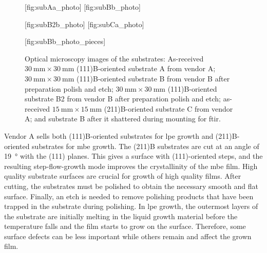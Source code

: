 \begin{figure}[htbp]
    \centering
    [fig:subAa_photo]
    \hfill
    [fig:subBb_photo]
    \par\bigskip
    [fig:subB2b_photo]
    \hfill
    [fig:subCa_photo]
    \par\bigskip
    [fig:subBb_photo_pieces]
    \caption[Optical microscopy images of the substrates.]{Optical microscopy images of the substrates:  As-received $\SI{30}{\milli\metre}\times\SI{30}{\milli\metre}$ (111)B-oriented substrate A from vendor A;  $\SI{30}{\milli\metre}\times\SI{30}{\milli\metre}$ (111)B-oriented substrate B from vendor B after preparation polish and etch;  $\SI{30}{\milli\metre}\times\SI{30}{\milli\metre}$ (111)B-oriented substrate B2 from vendor B after preparation polish and etch;  as-received $\SI{15}{\milli\metre}\times\SI{15}{\milli\metre}$ (211)B-oriented substrate C from vendor A; and  substrate B after it shattered during mounting for \ac{ftir}.}
    \label{fig:substrateABC}
\end{figure}

Vendor A sells both (111)B-oriented substrates for \ac{lpe} growth and (211)B-oriented substrates for \ac{mbe} growth. The (211)B substrates are cut at an angle of \SI{19}{\degree} with the (111) planes. This gives a surface with (111)-oriented steps, and the resulting step-flow-growth mode improves the crystallinity of the \ac{mbe} film. High quality substrate surfaces are crucial for growth of high quality films. After cutting, the substrates must be polished to obtain the necessary smooth and flat surface. Finally, an etch is needed to remove polishing products that have been trapped in the substrate during polishing. In \ac{lpe} growth, the outermost layers of the substrate are initially melting in the liquid growth material before the temperature falls and the film starts to grow on the surface. Therefore, some surface defects can be less important while others remain and affect the grown film.

